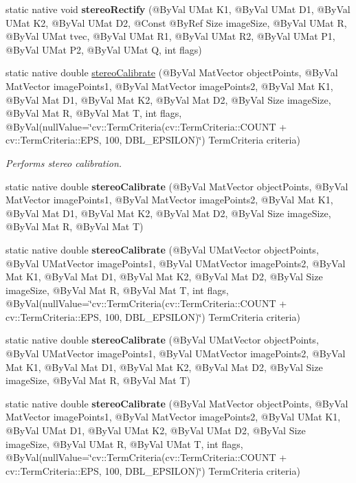 \begin{DoxyCompactItemize}
\item 
static native void {\bfseries stereo\+Rectify} (@By\+Val U\+Mat K1, @By\+Val U\+Mat D1, @By\+Val U\+Mat K2, @By\+Val U\+Mat D2, @Const @By\+Ref Size image\+Size, @By\+Val U\+Mat R, @By\+Val U\+Mat tvec, @By\+Val U\+Mat R1, @By\+Val U\+Mat R2, @By\+Val U\+Mat P1, @By\+Val U\+Mat P2, @By\+Val U\+Mat Q, int flags)
\item 
static native double \hyperlink{group__calib3d__fisheye_ga0134bbb31283b93ec8331c3b34923cd0}{stereo\+Calibrate} (@By\+Val Mat\+Vector object\+Points, @By\+Val Mat\+Vector image\+Points1, @By\+Val Mat\+Vector image\+Points2, @By\+Val Mat K1, @By\+Val Mat D1, @By\+Val Mat K2, @By\+Val Mat D2, @By\+Val Size image\+Size, @By\+Val Mat R, @By\+Val Mat T, int flags, @By\+Val(null\+Value=\char`\"{}cv\+::\+Term\+Criteria(cv\+::\+Term\+Criteria\+::\+C\+O\+U\+NT + cv\+::\+Term\+Criteria\+::\+E\+PS, 100, D\+B\+L\+\_\+\+E\+P\+S\+I\+L\+ON)\char`\"{}) Term\+Criteria criteria)
\begin{DoxyCompactList}\small\item\em Performs stereo calibration. \end{DoxyCompactList}\item 
static native double {\bfseries stereo\+Calibrate} (@By\+Val Mat\+Vector object\+Points, @By\+Val Mat\+Vector image\+Points1, @By\+Val Mat\+Vector image\+Points2, @By\+Val Mat K1, @By\+Val Mat D1, @By\+Val Mat K2, @By\+Val Mat D2, @By\+Val Size image\+Size, @By\+Val Mat R, @By\+Val Mat T)
\item 
static native double {\bfseries stereo\+Calibrate} (@By\+Val U\+Mat\+Vector object\+Points, @By\+Val U\+Mat\+Vector image\+Points1, @By\+Val U\+Mat\+Vector image\+Points2, @By\+Val Mat K1, @By\+Val Mat D1, @By\+Val Mat K2, @By\+Val Mat D2, @By\+Val Size image\+Size, @By\+Val Mat R, @By\+Val Mat T, int flags, @By\+Val(null\+Value=\char`\"{}cv\+::\+Term\+Criteria(cv\+::\+Term\+Criteria\+::\+C\+O\+U\+NT + cv\+::\+Term\+Criteria\+::\+E\+PS, 100, D\+B\+L\+\_\+\+E\+P\+S\+I\+L\+ON)\char`\"{}) Term\+Criteria criteria)
\item 
static native double {\bfseries stereo\+Calibrate} (@By\+Val U\+Mat\+Vector object\+Points, @By\+Val U\+Mat\+Vector image\+Points1, @By\+Val U\+Mat\+Vector image\+Points2, @By\+Val Mat K1, @By\+Val Mat D1, @By\+Val Mat K2, @By\+Val Mat D2, @By\+Val Size image\+Size, @By\+Val Mat R, @By\+Val Mat T)
\item 
static native double {\bfseries stereo\+Calibrate} (@By\+Val Mat\+Vector object\+Points, @By\+Val Mat\+Vector image\+Points1, @By\+Val Mat\+Vector image\+Points2, @By\+Val U\+Mat K1, @By\+Val U\+Mat D1, @By\+Val U\+Mat K2, @By\+Val U\+Mat D2, @By\+Val Size image\+Size, @By\+Val U\+Mat R, @By\+Val U\+Mat T, int flags, @By\+Val(null\+Value=\char`\"{}cv\+::\+Term\+Criteria(cv\+::\+Term\+Criteria\+::\+C\+O\+U\+NT + cv\+::\+Term\+Criteria\+::\+E\+PS, 100, D\+B\+L\+\_\+\+E\+P\+S\+I\+L\+ON)\char`\"{}) Term\+Criteria criteria)

\end{DoxyCompactItemize}
